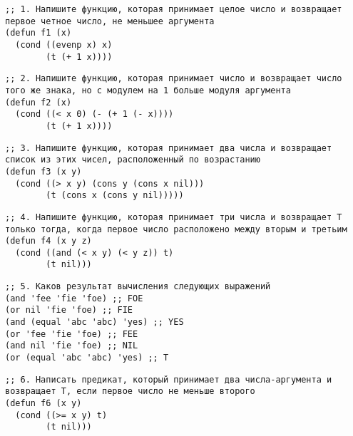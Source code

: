 \documentclass[a4paper,oneside,14pt]{extarticle}
\begin{document}

\setcounter{page}{2}
\renewcommand{\contentsname}{СОДЕРЖАНИЕ}




\begin{lstlisting}
;; 1. Напишите функцию, которая принимает целое число и возвращает первое четное число, не меньшее аргумента
(defun f1 (x)
  (cond ((evenp x) x)
        (t (+ 1 x))))
\end{lstlisting}

\begin{lstlisting}
;; 2. Напишите функцию, которая принимает число и возвращает число того же знака, но с модулем на 1 больше модуля аргумента
(defun f2 (x)
  (cond ((< x 0) (- (+ 1 (- x))))
        (t (+ 1 x))))
\end{lstlisting}

\begin{lstlisting}
;; 3. Напишите функцию, которая принимает два числа и возвращает список из этих чисел, расположенный по возрастанию
(defun f3 (x y)
  (cond ((> x y) (cons y (cons x nil)))
        (t (cons x (cons y nil)))))
\end{lstlisting}

\begin{lstlisting}
;; 4. Напишите функцию, которая принимает три числа и возвращает T только тогда, когда первое число расположено между вторым и третьим
(defun f4 (x y z)
  (cond ((and (< x y) (< y z)) t)
        (t nil)))
\end{lstlisting}

\begin{lstlisting}
;; 5. Каков результат вычисления следующих выражений
(and 'fee 'fie 'foe) ;; FOE
(or nil 'fie 'foe) ;; FIE
(and (equal 'abc 'abc) 'yes) ;; YES
(or 'fee 'fie 'foe) ;; FEE
(and nil 'fie 'foe) ;; NIL
(or (equal 'abc 'abc) 'yes) ;; T
\end{lstlisting}

\newpage

\begin{lstlisting}
;; 6. Написать предикат, который принимает два числа-аргумента и возвращает T, если первое число не меньше второго
(defun f6 (x y)
  (cond ((>= x y) t)
        (t nil)))
\end{lstlisting}
\end{document}
